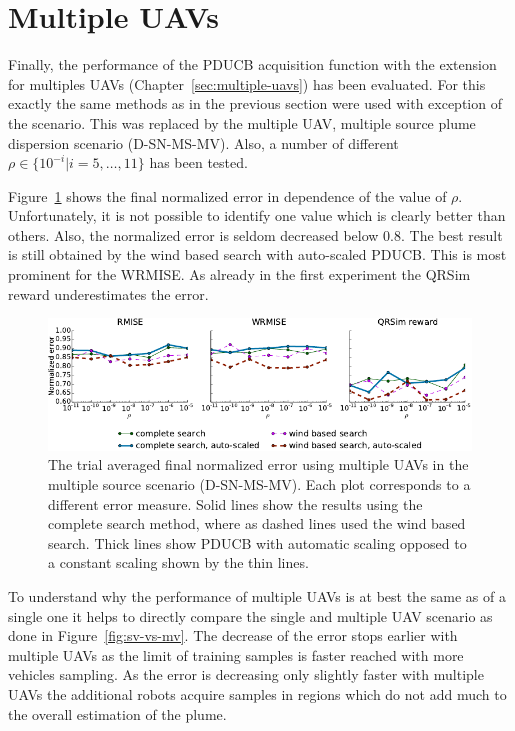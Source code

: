 \section{Multiple UAVs}
Finally, the performance of the PDUCB acquisition function with the extension 
for multiples UAVs (Chapter~\ref{sec:multiple-uavs}) has been evaluated. For 
this exactly the same methods as in the previous section were used with 
exception of the scenario. This was replaced by the multiple UAV, multiple 
source plume dispersion scenario (D-SN-MS-MV). Also, a number of different $\rho 
\in \{10^{-i} | i = 5, \dots, 11\}$ has been tested.

Figure~\ref{fig:mv-err} shows the final normalized error in dependence of the 
value of $\rho$. Unfortunately, it is not possible to identify one value which 
is clearly better than others. Also, the normalized error is seldom decreased 
below \num{0.8}. The best result is still obtained by the wind based search with 
auto-scaled PDUCB\@. This is most prominent for the WRMISE\@. As already in the 
first experiment the QRSim reward underestimates the error.

\begin{figure}
    \centering
    \includegraphics{plots/multiple-uav}
    \caption[Normalized error using multiple UAVs in dependence of $\rho$]{The 
        trial averaged final normalized error using multiple UAVs in the 
        multiple source scenario (D-SN-MS-MV).  Each plot corresponds to 
        a different error measure. Solid lines show the results using the 
        complete search method, where as dashed lines used the wind based 
        search.  Thick lines show PDUCB with automatic scaling opposed to 
        a constant scaling shown by the thin lines.}\label{fig:mv-err}
\end{figure}

To understand why the performance of multiple UAVs is at best the same as of 
a single one it helps to directly compare the single and multiple UAV scenario 
as done in Figure~\ref{fig:sv-vs-mv}.  The decrease of the error stops earlier 
with multiple UAVs as the limit of training samples is faster reached with more 
vehicles sampling.  As the error is decreasing only slightly faster with 
multiple UAVs the additional robots acquire samples in regions which do not add 
much to the overall estimation of the plume.

